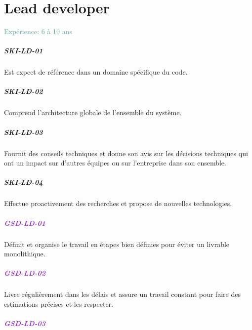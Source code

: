 \documentclass[a4paper, french, openany, 12pt]{book}
\newcommand\dex[1]{\textcolor{BrickRed}{\textbf{\uppercase{ski-{#1}}}}}
\newcommand\str[1]{\textcolor{DarkOrchid}{\textbf{\uppercase{gsd-{#1}}}}}
\newcommand\xp[1]{\textcolor{CadetBlue}{Expérience: {#1} ans}}
\begin{document}
\chapter{Lead developer}

\xp{6 à 10}

\begin{multicols}{2}

  \paragraph*{\dex{ld-01}}

  Est expect de référence dans un domaine spécifique du code.

  \paragraph*{\dex{ld-02}}

  Comprend l'architecture globale de l'ensemble du système.

  \paragraph*{\dex{ld-03}}

  Fournit des conseils techniques et donne son avis sur les décisions techniques qui ont un impact sur d'autres équipes ou
  sur l'entreprise dans son ensemble. 

  \paragraph*{\dex{ld-04}}

  Effectue proactivement des recherches et propose de nouvelles technologies.

  \paragraph*{\str{ld-01}}

  Définit et organise le travail en étapes bien définies pour éviter un livrable monolithique.

  \paragraph*{\str{ld-02}}

  Livre régulièrement dans les délais et assure un travail constant pour faire des estimations précises et les 
  respecter.

  \paragraph*{\str{ld-03}}


\end{multicols}
\end{document}
